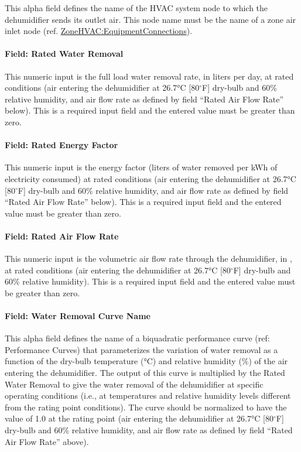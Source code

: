 This alpha field defines the name of the HVAC system node to which the dehumidifier sends its outlet air. This node name must be the name of a zone air inlet node (ref. \hyperref[zonehvacequipmentconnections]{ZoneHVAC:EquipmentConnections}).

\paragraph{Field: Rated Water Removal}\label{field-rated-water-removal}

This numeric input is the full load water removal rate, in liters per day, at rated conditions (air entering the dehumidifier at 26.7\si{\degreeCelsius} {[}80$^\circ$F{]} dry-bulb and 60\% relative humidity, and air flow rate as defined by field ``Rated Air Flow Rate'' below). This is a required input field and the entered value must be greater than zero.

\paragraph{Field: Rated Energy Factor}\label{field-rated-energy-factor}

This numeric input is the energy factor (liters of water removed per kWh of electricity consumed) at rated conditions (air entering the dehumidifier at 26.7\si{\degreeCelsius} {[}80$^\circ$F{]} dry-bulb and 60\% relative humidity, and air flow rate as defined by field ``Rated Air Flow Rate'' below). This is a required input field and the entered value must be greater than zero.

\paragraph{Field: Rated Air Flow Rate}\label{field-rated-air-flow-rate-001}

This numeric input is the volumetric air flow rate through the dehumidifier, in \si{\volumeFlowRate}, at rated conditions (air entering the dehumidifier at 26.7\si{\degreeCelsius} {[}80$^\circ$F{]} dry-bulb and 60\% relative humidity). This is a required input field and the entered value must be greater than zero.

\paragraph{Field: Water Removal Curve Name}\label{field-water-removal-curve-name}

This alpha field defines the name of a biquadratic performance curve (ref: Performance Curves) that parameterizes the variation of water removal as a function of the dry-bulb temperature (\si{\degreeCelsius}) and relative humidity (\%) of the air entering the dehumidifier. The output of this curve is multiplied by the Rated Water Removal to give the water removal of the dehumidifier at specific operating conditions (i.e., at temperatures and relative humidity levels different from the rating point conditions). The curve should be normalized to have the value of 1.0 at the rating point (air entering the dehumidifier at 26.7\si{\degreeCelsius} {[}80$^\circ$F{]} dry-bulb and 60\% relative humidity, and air flow rate as defined by field ``Rated Air Flow Rate'' above).

